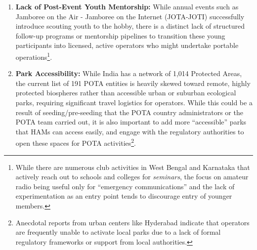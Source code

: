 \documentclass[conference]{IEEEtran}
\begin{document}
\begin{enumerate}
{      licensed operator responded, ``Thank you! HAM is probably the only
      hobby where 40s is considered young :-)''.}.
    \item \textbf{Lack of Post-Event Youth Mentorship:} While annual
      events such as Jamboree on the Air - Jamboree on the Internet
      (JOTA-JOTI)\cite{b13} successfully introduce scouting youth to
      the hobby, there is a distinct lack of structured follow-up
      programs or mentorship pipelines to transition these young
      participants into licensed, active operators who might undertake
      portable operations\footnote{While there are numerous club activities in West
      Bengal and Karnataka that actively reach out to schools and
      colleges for \textit{seminars}, the focus on amateur radio being
      useful only for ``emergency communications'' and the lack of
      experimentation as an entry point tends to discourage entry of
      younger members.}.
    \item \textbf{Park Accessibility:} While India has a network
      of 1,014 Protected Areas, the current list of 191 POTA
      entities is heavily skewed toward remote, highly protected biospheres
      rather than accessible urban or suburban ecological parks,
      requiring significant travel logistics for operators. While this
      could be a result of seeding/pre-seeding that the POTA country
      administrators or the POTA team carried out, it is also
      important to add more ``accessible'' parks that HAMs can access
      easily, and engage with the regulatory authorities to open these
      spaces for POTA activities\footnote{Anecdotal reports from urban
        centers like Hyderabad indicate that operators are frequently
        unable to activate local parks due to a lack of formal regulatory
        frameworks or support from local authorities.}.
    \end{enumerate}
\end{document}
